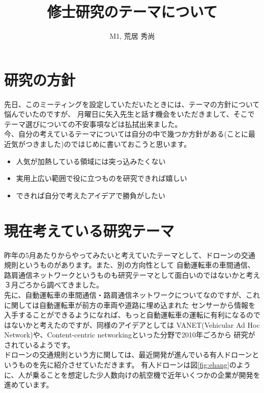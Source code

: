 \documentclass[a4paper,10pt]{jsarticle}
\title{修士研究のテーマについて}
\author{M1, 荒居 秀尚}
\begin{document}
\maketitle

\section{研究の方針}
先日、このミーティングを設定していただいたときには、テーマの方針について悩んでいたのですが、
月曜日に矢入先生と話す機会をいただきまして、そこでテーマ選びについての不安事項などは払拭出来ました。\\

今、自分の考えているテーマについては自分の中で幾つか方針がある(ことに最近気がつきました)のではじめに書いておこうと思います。\\

\begin{itemize}
 \item 人気が加熱している領域には突っ込みたくない
 \item 実用上広い範囲で役に立つものを研究できれば嬉しい
 \item できれば自分で考えたアイデアで勝負がしたい
\end{itemize}


\section{現在考えている研究テーマ}

昨年の5月あたりからやってみたいと考えていたテーマとして、ドローンの交通規則というものがあります。また、別の方向性として
自動運転車の車間通信、路肩通信ネットワークというものも研究テーマとして面白いのではないかと考え３月ごろから調べてきました。\\

先に、自動運転車の車間通信・路肩通信ネットワークについてなのですが、これに関しては自動運転車が前方の車両や道路に埋め込まれた
センサーから情報を入手することができるようになれば、もっと自動運転車の運転に有利になるのではないかと考えたのですが、同様のアイデアとしては
VANET(Vehicular Ad Hoc Network)\cite{vanet}や、Content-centric networking\cite{content_centric}といった分野で2010年ごろから
研究がされているようです。\\

ドローンの交通規則という方に関しては、最近開発が進んでいる有人ドローンというものを先に紹介させていただきます。
有人ドローンは図\ref{fig:ehang}のように、人が乗ることを想定した少人数向けの航空機で近年いくつかの企業が開発を進めています。
\end{document}
